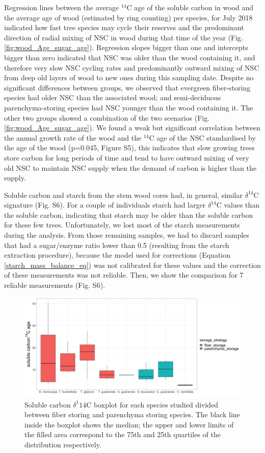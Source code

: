 \documentclass{article}
\begin{document}
Regression lines between the average $^{14}$C age of the soluble carbon in wood and the average age of wood (estimated by ring counting) per species, for July 2018 indicated how fast tree species may cycle their reserves and the predominant direction of radial mixing of NSC in wood during that time of the year (Fig. \ref{fig:wood_Age_sugar_age}). Regression slopes bigger than one and intercepts bigger than zero indicated that NSC was older than the wood containing it, and therefore very slow NSC cycling rates and predominantly outward mixing of NSC from deep old layers of wood to new ones during this sampling date. Despite no significant differences between groups, we observed that evergreen fiber-storing species had older NSC than the associated wood; and semi-deciduous parenchyma-storing species had NSC younger than the wood containing it. The other two groups showed a combination of the two scenarios (Fig. \ref{fig:wood_Age_sugar_age}). We found a weak but significant correlation between the annual growth rate of the wood and the $^{14}$C age of the NSC standardised by the age of the wood (p=0.045, Figure S5), this indicates that slow growing trees store carbon for long periods of time and tend to have outward mixing of very old NSC to maintain NSC supply when the demand of carbon is higher than the supply.

Soluble carbon and starch from the stem wood cores had, in general, similar $\delta^{14}$C signature (Fig. S6). For a couple of individuals starch had larger $\delta^{14}$C values than the soluble carbon, indicating that starch may be older than the soluble carbon for these few trees. Unfortunately, we lost most of the starch measurements during the analysis. From those remaining samples, we had to discard samples that had a sugar/enzyme ratio lower than 0.5 (resulting from the starch extraction procedure), because the model used for corrections (Equation \ref{starch_mass_balance_eq}) was not calibrated for these values and the correction of these measurements was not reliable. Then, we show the comparison for 7 reliable measurements (Fig. S6). 


 \begin{figure}[h] %
   \centering
   \includegraphics[width=5.5in]{D14C_sugars_perspecies.png} 
   \caption{ Soluble carbon $\delta^1{14}$C boxplot for each species studied divided between fiber storing and parenchyma storing species. The black line inside the boxplot shows the median; the upper and lower limits of the filled area correspond to the 75th and 25th quartiles of the distribution respectively.}
   \label{fig:D14C_starch}
\end{figure}
 
\end{document}
